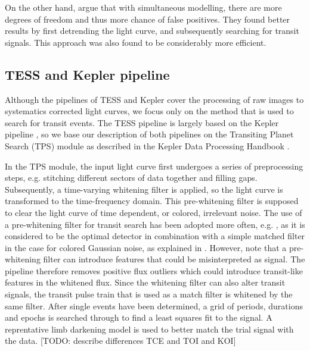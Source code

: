 On the other hand, \cite{kovacs2016periodic} argue that with simultaneous modelling, there are more degrees of freedom and thus more chance of false positives. They found better results by first detrending the light curve, and subsequently searching for transit signals. This approach was also found to be considerably more efficient.

\subsection{TESS and Kepler pipeline}
Although the pipelines of TESS and Kepler cover the processing of raw images to systematics corrected light curves, we focus only on the method that is used to search for transit events.  The TESS pipeline is largely based on the Kepler pipeline \citep{jenkins2016tess}, so we base our description of both pipelines on the Transiting Planet Search (TPS) module as described in the Kepler Data Processing Handbook \cite{jenkins2017kepler}. 

In the TPS module, the input light curve first undergoes a series of preprocessing steps, e.g. stitching different sectors of data together and filling gaps. Subsequently, a time-varying whitening filter is applied, so the light curve is transformed to the time-frequency domain. This pre-whitening filter is supposed to clear the light curve of time dependent, or colored, irrelevant noise. The use of a pre-whitening filter for transit search has been adopted more often, e.g. \cite{carpano2003detecting}, as it is considered to be the optimal detector in combination with a simple matched filter in the case for colored Gaussian noise, as explained in \cite{jenkins2002impact}. However, \cite{rodenbeck2018revisiting} note that a pre-whitening filter can introduce features that could be misinterpreted as signal. The pipeline therefore removes positive flux outliers which could introduce transit-like features in the whitened flux. Since the whitening filter can also alter transit signals, the transit pulse train that is used as a match filter is whitened by the same filter. After single events have been determined, a grid of periods, durations and epochs is searched through to find a least squares fit to the signal. A reprentative limb darkening model is used to better match the trial signal with the data.
[TODO: describe differences TCE and TOI and KOI]

